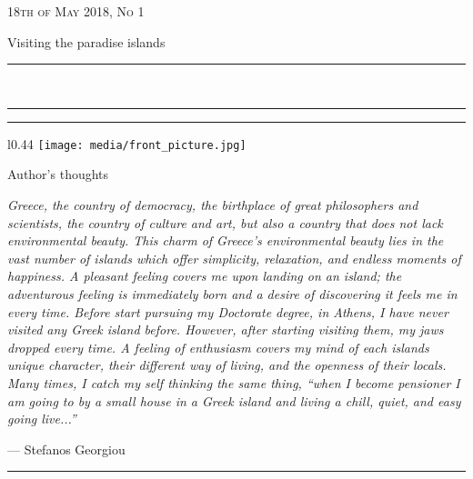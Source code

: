 \documentclass[10pt,a4paper]{article} %
\newcommand{\HorRule}[1]{\noindent\rule{\linewidth}{#1}} %
\newcommand{\SepRule}{\noindent	%
\begin{center}
\rule{250pt}{1pt} %
\end{center}
}
\newcommand{\NewsletterName}[1]{ %
\begin{center}
\Huge \usefont{T1}{fvs}{b}{n} %
#1
\end{center}	
\par \normalsize \normalfont}
\newcommand{\JournalIssue}[1]{ %
\hfill \textsc{18th of May 2018, No #1} %
\par \normalsize \normalfont}
\newcommand{\NewsItem}[1]{ %
\usefont{T1}{fvs}{n}{n} %
\vspace{24pt}\large #1\vspace{3pt} %
\par \normalsize \normalfont}
\begin{document}
\JournalIssue{1} %

\NewsletterName{Visiting the paradise islands} %

\noindent\HorRule{3pt} \\[-0.75\baselineskip] %
\HorRule{1pt} %


\vspace{0.5cm}
\SepRule
\vspace{-0.5cm}

\begin{center}
\begin{minipage}[h]{0.84\linewidth}
\begin{wrapfigure}{l}{0.44\textwidth}
\texttt{[image: media/front\_picture.jpg]}
\\
\end{wrapfigure}
	
\NewsItem{Author's thoughts} %
\vspace{3pt} %
\textit{
Greece, the country of democracy, the birthplace of great philosophers and scientists, 
the country of culture and art, but also a country that does not lack environmental 
beauty. 
This charm of Greece's environmental beauty lies in the vast number of islands which offer 
simplicity, relaxation, and endless moments of happiness. 
A pleasant feeling covers me upon landing on an island; the adventurous feeling 
is immediately born and a desire of discovering it feels me in every time. 
Before start pursuing my Doctorate degree, in Athens, I have never visited any 
Greek island before. 
However, after starting visiting them, my jaws dropped every time. 
A feeling of enthusiasm covers my mind of each islands unique character, 
their different way of living, and the openness of their locals.
Many times, I catch my self thinking the same thing, ``when I become pensioner I am 
going to by a small house in a Greek island and living a chill, quiet, and easy 
going live...''
}
\par\hfill --- Stefanos Georgiou
\end{minipage}
\end{center}

\vspace{0.5cm}
\SepRule %
\vspace{0.5cm}
\end{document}

